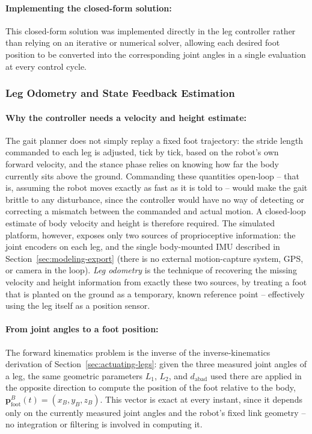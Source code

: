 \documentclass[12pt]{article}
\begin{document}
\paragraph{Implementing the closed-form solution:} This closed-form solution was implemented directly in the leg controller rather than relying on an iterative or numerical solver, allowing each desired foot position to be converted into the corresponding joint angles in a single evaluation at every control cycle.

\subsubsection{Leg Odometry and State Feedback Estimation}
\label{subsec:leg-odometry}

\paragraph{Why the controller needs a velocity and height estimate:} The gait planner does not simply replay a fixed foot trajectory: the stride length commanded to each leg is adjusted, tick by tick, based on the robot's own forward velocity, and the stance phase relies on knowing how far the body currently sits above the ground. Commanding these quantities open-loop -- that is, assuming the robot moves exactly as fast as it is told to -- would make the gait brittle to any disturbance, since the controller would have no way of detecting or correcting a mismatch between the commanded and actual motion. A closed-loop estimate of body velocity and height is therefore required. The simulated platform, however, exposes only two sources of proprioceptive information: the joint encoders on each leg, and the single body-mounted IMU described in Section~\ref{sec:modeling-export} (there is no external motion-capture system, GPS, or camera in the loop). \emph{Leg odometry} is the technique of recovering the missing velocity and height information from exactly these two sources, by treating a foot that is planted on the ground as a temporary, known reference point -- effectively using the leg itself as a position sensor.

\paragraph{From joint angles to a foot position:} The forward kinematics problem is the inverse of the inverse-kinematics derivation of Section~\ref{sec:actuating-legs}: given the three measured joint angles of a leg, the same geometric parameters $L_1$, $L_2$, and $d_{\text{abad}}$ used there are applied in the opposite direction to compute the position of the foot relative to the body, $\mathbf{p}^{B}_{\text{foot}}(t) = (x_B, y_B, z_B)$. This vector is exact at every instant, since it depends only on the currently measured joint angles and the robot's fixed link geometry -- no integration or filtering is involved in computing it.
\end{document}
